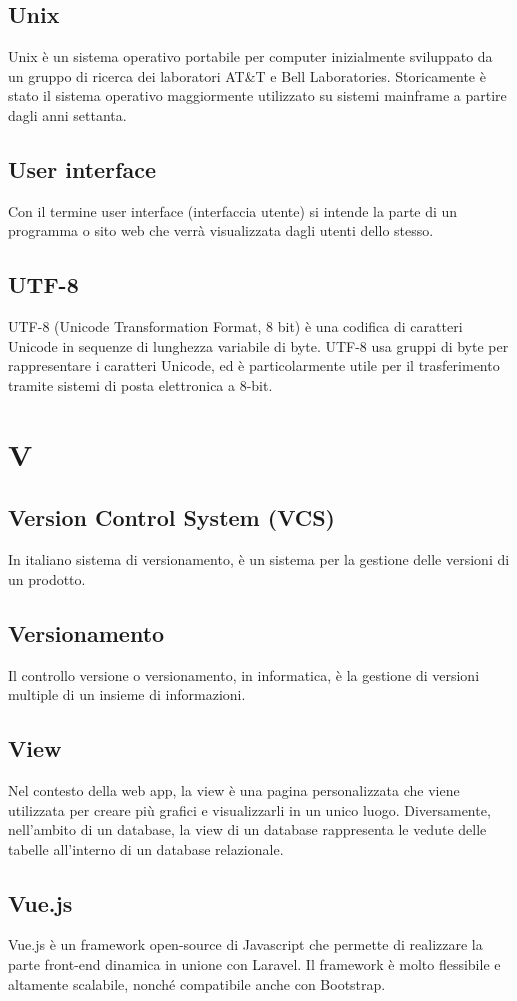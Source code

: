 \subsection{Unix}  Unix è un sistema operativo portabile per computer inizialmente sviluppato da un gruppo di ricerca dei laboratori AT\&T e Bell Laboratories. Storicamente è stato il sistema operativo maggiormente utilizzato su sistemi mainframe a partire dagli anni settanta.
\subsection{User interface}  Con il termine user interface (interfaccia utente) si intende la parte di un programma o sito web che verrà visualizzata dagli utenti dello stesso.
\subsection{UTF-8}  UTF-8 (Unicode Transformation Format, 8 bit) è una codifica di caratteri Unicode in sequenze di lunghezza variabile di byte. UTF-8 usa gruppi di byte per rappresentare i caratteri Unicode, ed è particolarmente utile per il trasferimento tramite sistemi di posta elettronica a 8-bit.

\newpage \section{V}
\subsection{Version Control System (VCS)} In italiano sistema di versionamento, è un sistema per la gestione delle versioni di un prodotto.
\subsection{Versionamento} Il controllo versione o versionamento, in informatica, è la gestione di versioni multiple di un insieme di informazioni. 
\subsection{View} Nel contesto della web app, la view è una pagina personalizzata che viene utilizzata per creare più grafici e visualizzarli in un unico luogo. Diversamente, nell'ambito di un database, la view di un database rappresenta le vedute delle tabelle all'interno di un database relazionale.
\subsection{Vue.js}  Vue.js è un framework open-source di Javascript che permette di realizzare la parte front-end dinamica in unione con Laravel. Il framework è molto flessibile e altamente scalabile, nonché compatibile anche con Bootstrap.

